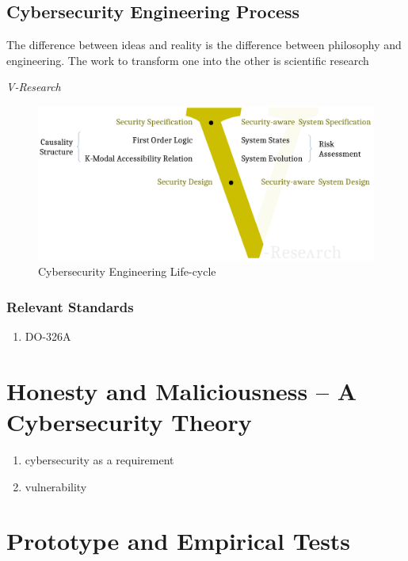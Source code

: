 \documentclass{article}
\theoremstyle{definition}
\theoremstyle{corollary}
\theoremstyle{lemma}
\theoremstyle{theorem}
\theoremstyle{theorem}
\begin{document}
\subsection{Cybersecurity Engineering Process}\label{sec:process}
\epigraph{The difference between ideas and reality is the
difference between philosophy and engineering. The work to transform one into
the other is scientific research}{{\itshape V-Research}}
\begin{figure}[t]
	\centering
	\includegraphics[width=\textwidth]{vmodel.pdf}
	\caption{Cybersecurity Engineering Life-cycle}
	\label{fig:knowledge-belief}
\end{figure}


\subsubsection{Relevant Standards}\label{sec:standards}
\begin{enumerate}[noitemsep]
	\item DO-326A
\end{enumerate}

\section{Honesty and Maliciousness -- A Cybersecurity Theory}\label{sec:theory}
\begin{enumerate}[noitemsep]
	\item cybersecurity as a requirement
	\item vulnerability\label{def:vulnerability}
\end{enumerate}

\section{Prototype and Empirical Tests}\label{sec:prototest}
\end{document}
